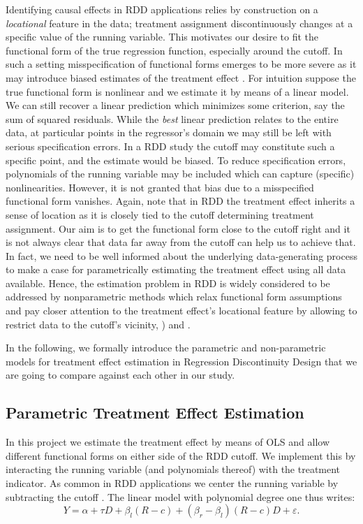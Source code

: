 Identifying causal effects in RDD applications relies by construction on a \textit{locational} feature in the data; treatment assignment discontinuously changes at a specific value of the running variable. This motivates our desire to fit the functional form of the true regression function, especially around the cutoff. In such a setting misspecification of functional forms emerges to be more severe as it may introduce biased estimates of the treatment effect \cite{lee_lemieux}. For intuition suppose the true functional form is nonlinear and we estimate it by means of a linear model. We can still recover a linear prediction which minimizes some criterion, say the sum of squared residuals. While the \textit{best} linear prediction relates to the entire data, at particular points in the regressor's domain we may still be left with serious specification errors. In a RDD study the cutoff may constitute such a specific point, and the estimate would be biased. To reduce specification errors, polynomials of the running variable may be included which can capture (specific) nonlinearities. However, it is not granted that bias due to a misspecified functional form vanishes. Again, note that in RDD the treatment effect inherits a sense of location as it is closely tied to the cutoff determining treatment assignment. Our aim is to get the functional form close to the cutoff right and it is not always clear that data far away from the cutoff can help us to achieve that. In fact, we need to be well informed about the underlying data-generating process to make a case for parametrically estimating the treatment effect using all data available. Hence, the estimation problem in RDD is widely considered to be addressed by nonparametric methods which relax functional form assumptions and pay closer attention to the treatment effect's locational feature by allowing to restrict data to the cutoff's vicinity, \cite{hahn_et_al}) and \cite{lee_lemieux}.

In the following, we formally introduce the parametric and non-parametric models for treatment effect estimation in Regression Discontinuity Design that we are going to compare against each other in our study.


\subsection{Parametric Treatment Effect Estimation} %
\label{sec: param}
In this project we estimate the treatment effect by means of OLS and allow different functional forms on either side of the RDD cutoff. We implement this by interacting the running variable (and polynomials thereof) with the treatment indicator. As common in RDD applications we center the running variable by subtracting the cutoff \cite{lee_lemieux}. The linear model with polynomial degree one thus writes:
\begin{equation}
Y = \alpha + \tau D + \beta_{l} (R-c) + (\beta_{r} - \beta_{l}) (R-c) D + \varepsilon .
\label{eq: model_param}
\end{equation}

